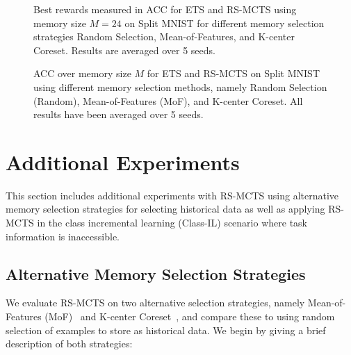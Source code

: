 
\begin{figure*}[t]
  \centering
  \setlength{\figwidth}{0.32\textwidth}
  \setlength{\figheight}{0.25\textwidth}
  
  \caption{Best rewards measured in ACC for ETS and RS-MCTS using memory size $M=24$ on Split MNIST for different memory selection strategies Random Selection, Mean-of-Features, and K-center Coreset. Results are averaged over 5 seeds. 
  }%
  \label{fig:MNIST_mcts_best_rewards_M24_selection_methods_appendix}
\end{figure*}

\begin{figure*}[t]
  \centering
  \setlength{\figwidth}{0.6\textwidth}
  \setlength{\figheight}{0.4\textwidth}
  
  \caption{ACC over memory size $M$ for ETS and RS-MCTS on Split MNIST using different memory selection methods, namely Random Selection (Random), Mean-of-Features (MoF), and K-center Coreset. All results have been averaged over 5 seeds. 
  }\vspace{-12pt}
  \label{fig:MNIST_ACC_over_M_selection_methods_appendix}
\end{figure*}

\section{Additional Experiments}\label{app:additional_experiments}

This section includes additional experiments with RS-MCTS using alternative memory selection strategies for selecting historical data as well as applying RS-MCTS in the class incremental learning (Class-IL) scenario where task information is inaccessible. 

\subsection{Alternative Memory Selection Strategies}
We evaluate RS-MCTS on two alternative selection strategies, namely Mean-of-Features (MoF)~\cite{rebuffi2017icarl} and K-center Coreset~\cite{nguyen2017variational}, and compare these to using random selection of examples to store as historical data. We begin by giving a brief description of both strategies: \vspace{-12pt}

